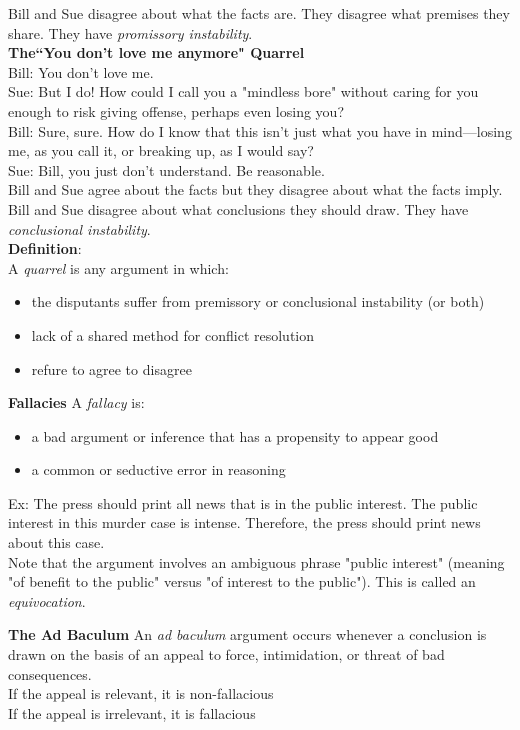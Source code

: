 \documentclass[11pt, fleqn]{article}
\begin{document}
Bill and Sue disagree about what the facts are. They disagree what premises they share. They have \textit{promissory instability}.\\

\textbf{The``You don't love me anymore" Quarrel}\\
Bill: You don't love me.\\
Sue: But I do! How could I call you a "mindless bore" without caring for you enough to risk giving offense, perhaps even losing you?\\
Bill: Sure, sure. How do I know that this isn't just what you have in mind—losing me, as you call it, or breaking up, as I would say?\\
Sue: Bill, you just don't understand. Be reasonable.\\

Bill and Sue agree about the facts but they disagree about what the facts imply. Bill and Sue disagree about what conclusions they should draw. They have \textit{conclusional instability}.\\

\textbf{Definition}:\\
A \textit{quarrel} is any argument in which:
\begin{itemize}
    \item the disputants suffer from premissory or conclusional instability (or both)
    \item lack of a shared method for conflict resolution
    \item refure to agree to disagree
\end{itemize}

\textbf{Fallacies}
A \textit{fallacy} is:
\begin{itemize}
    \item a bad argument or inference that has a propensity to appear good
    \item a common or seductive error in reasoning
\end{itemize}
Ex: The press should print all news that is in the public interest. The public interest in this murder case is intense. Therefore, the press should print news about this case.\\

Note that the argument involves an ambiguous phrase "public interest" (meaning "of benefit to the public" versus "of interest to the public"). This is called an \textit{equivocation}.

\textbf{The Ad Baculum}
An \textit{ad baculum} argument occurs whenever a conclusion is drawn on the basis of an appeal to force, intimidation, or threat of bad consequences.\\
If the appeal is relevant, it is non-fallacious\\
If the appeal is irrelevant, it is fallacious\\
\end{document}
